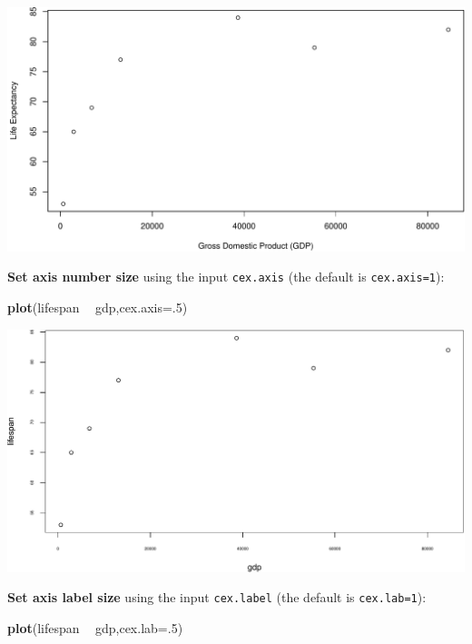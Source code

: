 \documentclass[
]{book}
\newenvironment{Shaded}{\begin{snugshade}}{\end{snugshade}}
\newcommand{\DataTypeTok}[1]{\textcolor[rgb]{0.13,0.29,0.53}{#1}}
\newcommand{\DecValTok}[1]{\textcolor[rgb]{0.00,0.00,0.81}{#1}}
\newcommand{\KeywordTok}[1]{\textcolor[rgb]{0.13,0.29,0.53}{\textbf{#1}}}
\newcommand{\NormalTok}[1]{#1}
\newcommand{\OperatorTok}[1]{\textcolor[rgb]{0.81,0.36,0.00}{\textbf{#1}}}
\newcommand{\StringTok}[1]{\textcolor[rgb]{0.31,0.60,0.02}{#1}}
\begin{document}
\includegraphics{figures/unnamed-chunk-231-1.pdf}

\textbf{Set axis number size} using the input \texttt{cex.axis} (the default is \texttt{cex.axis=1}):

\begin{Shaded}
\begin{Highlighting}[]
\KeywordTok{plot}\NormalTok{(lifespan }\OperatorTok{~}\StringTok{ }\NormalTok{gdp,}\DataTypeTok{cex.axis=}\NormalTok{.}\DecValTok{5}\NormalTok{)}
\end{Highlighting}
\end{Shaded}

\includegraphics{figures/unnamed-chunk-232-1.pdf}

\textbf{Set axis label size} using the input \texttt{cex.label} (the default is \texttt{cex.lab=1}):

\begin{Shaded}
\begin{Highlighting}[]
\KeywordTok{plot}\NormalTok{(lifespan }\OperatorTok{~}\StringTok{ }\NormalTok{gdp,}\DataTypeTok{cex.lab=}\NormalTok{.}\DecValTok{5}\NormalTok{)}
\end{Highlighting}
\end{Shaded}
\end{document}
